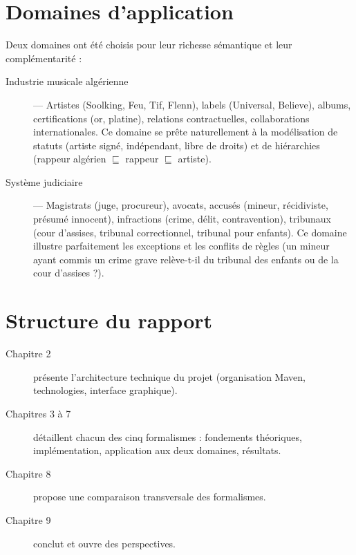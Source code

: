 \section{Domaines d'application}

Deux domaines ont été choisis pour leur richesse sémantique et leur
complémentarité :

\begin{description}
  \item[Industrie musicale algérienne] — Artistes (Soolking, Feu, Tif, Flenn),
    labels (Universal, Believe), albums, certifications (or, platine),
    relations contractuelles, collaborations internationales.
    Ce domaine se prête naturellement à la modélisation de statuts
    (artiste signé, indépendant, libre de droits) et de hiérarchies
    (rappeur algérien $\sqsubseteq$ rappeur $\sqsubseteq$ artiste).

  \item[Système judiciaire] — Magistrats (juge, procureur), avocats,
    accusés (mineur, récidiviste, présumé innocent), infractions (crime, délit,
    contravention), tribunaux (cour d'assises, tribunal correctionnel,
    tribunal pour enfants).
    Ce domaine illustre parfaitement les exceptions et les conflits de règles
    (un mineur ayant commis un crime grave relève-t-il du tribunal des enfants
    ou de la cour d'assises ?).
\end{description}

\section{Structure du rapport}

\begin{description}
  \item[Chapitre 2] présente l'architecture technique du projet (organisation
        Maven, technologies, interface graphique).
  \item[Chapitres 3 à 7] détaillent chacun des cinq formalismes :
        fondements théoriques, implémentation, application aux deux domaines,
        résultats.
  \item[Chapitre 8] propose une comparaison transversale des formalismes.
  \item[Chapitre 9] conclut et ouvre des perspectives.
\end{description}
